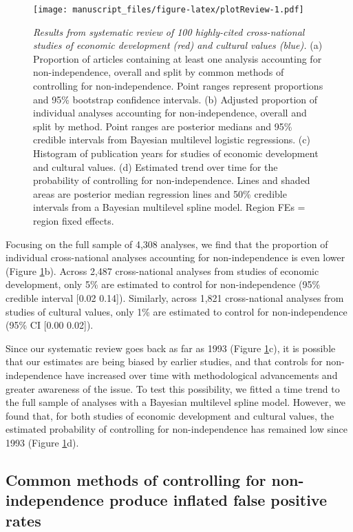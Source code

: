 \documentclass[
  english,
  man,floatsintext]{apa6}
\begin{document}
\begin{figure}
\centering
\texttt{[image: manuscript\_files/figure-latex/plotReview-1.pdf]}
\caption{\label{fig:plotReview}\emph{Results from systematic review of 100 highly-cited cross-national studies of economic development (red) and cultural values (blue).} (a) Proportion of articles containing at least one analysis accounting for non-independence, overall and split by common methods of controlling for non-independence. Point ranges represent proportions and 95\% bootstrap confidence intervals. (b) Adjusted proportion of individual analyses accounting for non-independence, overall and split by method. Point ranges are posterior medians and 95\% credible intervals from Bayesian multilevel logistic regressions. (c) Histogram of publication years for studies of economic development and cultural values. (d) Estimated trend over time for the probability of controlling for non-independence. Lines and shaded areas are posterior median regression lines and 50\% credible intervals from a Bayesian multilevel spline model. Region FEs = region fixed effects.}
\end{figure}

Focusing on the full sample of 4,308 analyses, we find that the proportion of individual cross-national analyses accounting for non-independence is even lower (Figure \ref{fig:plotReview}b). Across 2,487 cross-national analyses from studies of economic development, only 5\% are estimated to control for non-independence (95\% credible interval {[}0.02 0.14{]}). Similarly, across 1,821 cross-national analyses from studies of cultural values, only 1\% are estimated to control for non-independence (95\% CI {[}0.00 0.02{]}).

Since our systematic review goes back as far as 1993 (Figure \ref{fig:plotReview}c), it is possible that our estimates are being biased by earlier studies, and that controls for non-independence have increased over time with methodological advancements and greater awareness of the issue. To test this possibility, we fitted a time trend to the full sample of analyses with a Bayesian multilevel spline model. However, we found that, for both studies of economic development and cultural values, the estimated probability of controlling for non-independence has remained low since 1993 (Figure \ref{fig:plotReview}d).

\hypertarget{common-methods-of-controlling-for-non-independence-produce-inflated-false-positive-rates}{%
\subsection{Common methods of controlling for non-independence produce inflated false positive rates}\label{common-methods-of-controlling-for-non-independence-produce-inflated-false-positive-rates}}
\end{document}
